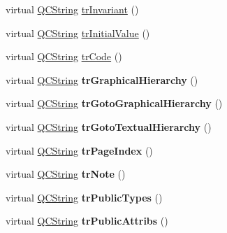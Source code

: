 \begin{DoxyCompactItemize}
\item 
virtual \mbox{\hyperlink{class_q_c_string}{Q\+C\+String}} \mbox{\hyperlink{class_translator_norwegian_a16488d8710c0fcdb2866f260bdc9bb3f}{tr\+Invariant}} ()
\item 
virtual \mbox{\hyperlink{class_q_c_string}{Q\+C\+String}} \mbox{\hyperlink{class_translator_norwegian_a0599a31dcae83d35b8ca12d6c77adf2a}{tr\+Initial\+Value}} ()
\item 
virtual \mbox{\hyperlink{class_q_c_string}{Q\+C\+String}} \mbox{\hyperlink{class_translator_norwegian_a2eaf23003da213d49b1faa922d4123fd}{tr\+Code}} ()
\item 
\mbox{\label{class_translator_norwegian_a77f0c694f7193d4d8b8ffb70239de111}} 
virtual \mbox{\hyperlink{class_q_c_string}{Q\+C\+String}} {\bfseries tr\+Graphical\+Hierarchy} ()
\item 
\mbox{\label{class_translator_norwegian_acf874ad0d57a0ed281725e85405bac36}} 
virtual \mbox{\hyperlink{class_q_c_string}{Q\+C\+String}} {\bfseries tr\+Goto\+Graphical\+Hierarchy} ()
\item 
\mbox{\label{class_translator_norwegian_a909788196a97e8b5bf27b97b5600b4f9}} 
virtual \mbox{\hyperlink{class_q_c_string}{Q\+C\+String}} {\bfseries tr\+Goto\+Textual\+Hierarchy} ()
\item 
\mbox{\label{class_translator_norwegian_af27a8d1a246a1140f5ce95d2ab2ca5b1}} 
virtual \mbox{\hyperlink{class_q_c_string}{Q\+C\+String}} {\bfseries tr\+Page\+Index} ()
\item 
\mbox{\label{class_translator_norwegian_a9955fd3a2da219c1e0b62c6c89c2a627}} 
virtual \mbox{\hyperlink{class_q_c_string}{Q\+C\+String}} {\bfseries tr\+Note} ()
\item 
\mbox{\label{class_translator_norwegian_a5d722105b7e4b4c250545d4342df7aa4}} 
virtual \mbox{\hyperlink{class_q_c_string}{Q\+C\+String}} {\bfseries tr\+Public\+Types} ()
\item 
\mbox{\label{class_translator_norwegian_afb7ad70c4ce5b8e6d78da0917b6fc2e0}} 
virtual \mbox{\hyperlink{class_q_c_string}{Q\+C\+String}} {\bfseries tr\+Public\+Attribs} ()

\end{DoxyCompactItemize}
